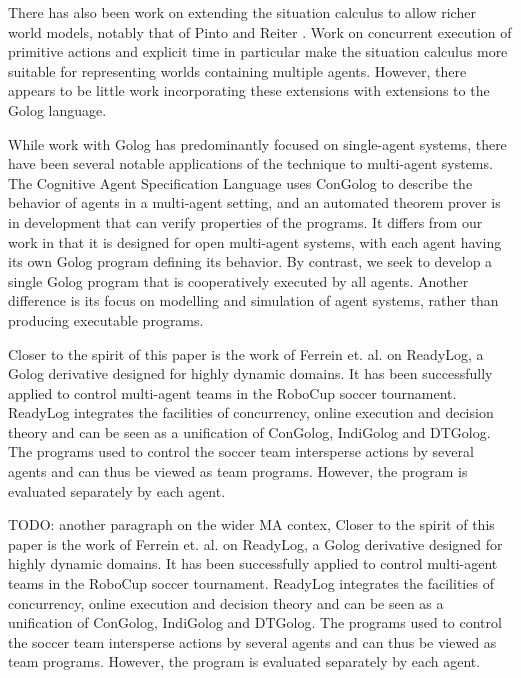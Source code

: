 \documentclass[letterpaper]{article}
\begin{document}
There has also been work on extending the situation calculus to allow
richer world models, notably that of Pinto \cite{pinto94temporal}
and Reiter \cite{reiter96sc_nat_conc}. Work on concurrent execution
of primitive actions and explicit time in particular make the situation
calculus more suitable for representing worlds containing multiple
agents. However, there appears to be little work incorporating these
extensions with extensions to the Golog language.

While work with Golog has predominantly focused on single-agent systems,
there have been several notable applications of the technique to multi-agent
systems. The Cognitive Agent Specification Language \cite{shapiro02casl}
uses ConGolog to describe the behavior of agents in a multi-agent
setting, and an automated theorem prover is in development that can
verify properties of the programs. It differs from our work in that
it is designed for open multi-agent systems, with each agent having
its own Golog program defining its behavior. By contrast, we seek
to develop a single Golog program that is cooperatively executed by
all agents. Another difference is its focus on modelling and simulation
of agent systems, rather than producing executable programs.

Closer to the spirit of this paper is the work of Ferrein et. al.
\cite{Ferrein2005readylog} on ReadyLog, a Golog derivative designed
for highly dynamic domains. It has been successfully applied to control
multi-agent teams in the RoboCup soccer tournament. ReadyLog integrates
the facilities of concurrency, online execution and decision theory
and can be seen as a unification of ConGolog, IndiGolog and DTGolog.
The programs used to control the soccer team intersperse actions by
several agents and can thus be viewed as team programs. However, the
program is evaluated separately by each agent.

TODO: another paragraph on the wider MA contex,
Closer to the spirit of this paper is the work of Ferrein et. al.
\cite{Ferrein2005readylog} on ReadyLog, a Golog derivative designed
for highly dynamic domains. It has been successfully applied to control
multi-agent teams in the RoboCup soccer tournament. ReadyLog integrates
the facilities of concurrency, online execution and decision theory
and can be seen as a unification of ConGolog, IndiGolog and DTGolog.
The programs used to control the soccer team intersperse actions by
several agents and can thus be viewed as team programs. However, the
program is evaluated separately by each agent.
\end{document}
